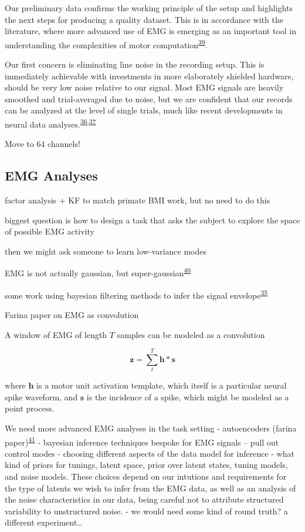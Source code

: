 \documentclass[
  a4paper,
]{article}
\begin{document}
Our preliminary data confirms the working principle of the setup and
highlights the next steps for producing a quality dataset. This is in
accordance with the literature, where more advanced use of EMG is
emerging as an important tool in understanding the complexities of motor
computation\textsuperscript{\protect\hyperlink{ref-Hug2011}{39}}.

Our first concern is eliminating line noise in the recording setup. This
is immediately achievable with investments in more elaborately shielded
hardware, should be very low noise relative to our signal. Most EMG
signals are heavily smoothed and trial-averaged due to noise, but we are
confident that our records can be analyzed at the level of single
trials, much like recent developments in neural data
analyses.\textsuperscript{\protect\hyperlink{ref-churchlandNeuralPopulationDynamics2012a}{36},\protect\hyperlink{ref-churchlandNeuralVariabilityPremotor2006}{37}}

Move to 64 channels!

\hypertarget{emg-analyses}{%
\subsection{EMG Analyses}\label{emg-analyses}}

factor analysis + KF to match primate BMI work, but no need to do this

biggest question is how to design a task that asks the subject to
explore the space of possible EMG activity

then we might ask someone to learn low-variance modes

EMG is not actually gaussian, but
super-gaussian\textsuperscript{\protect\hyperlink{ref-nazarpourNoteProbabilityDistribution2013}{40}}

some work using bayesian filtering methods to infer the signal
envelope\textsuperscript{\protect\hyperlink{ref-sangerBayesianFilteringMyoelectric2007}{35}}

Farina paper on EMG as convolution

A window of EMG of length \(T\) samples can be modeled as a convolution

\[
\mathbf{z} = \sum_t^T \mathbf{h} * \mathbf{s}
\]

where \(\mathbf{h}\) is a motor unit activation template, which itself
is a particular neural spike waveform, and \(\mathbf{s}\) is the
incidence of a spike, which might be modeled as a point process.

We need more advanced EMG analyses in the task setting - autoencoders
(farina
paper)\textsuperscript{\protect\hyperlink{ref-vujaklijaOnlineMappingEMG2018}{41}}
- bayesian inference techniques bespoke for EMG signals -- pull out
control modes - choosing different aspects of the data model for
inference - what kind of priors for tunings, latent space, prior over
latent states, tuning models, and noise models. These choices depend on
our intutions and requirements for the type of latents we wish to infer
from the EMG data, as well as an analysis of the noise characteristics
in our data, being careful not to attribute structured variability to
unstructured noise. - we would need some kind of round truth? a
different experiment\ldots{}
\end{document}
